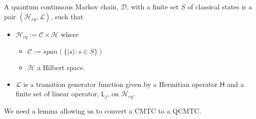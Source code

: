 \begin{definition}
  A quantum continuous Markov chain, $\mathcal{D}$, with a finite set
  $S$ of classical states is a pair $(\mathcal{H}_{cq},\mathcal{L})$,
  such that
  \begin{itemize}
     \item $\mathcal{H}_{cq} := \mathcal{C} \times \mathcal{H}$ where
       \begin{itemize}
          \item $\mathcal{C} := span(\{ \mathsf{|}s\rangle : s \in S\})$
          \item $\mathcal{H}$ a Hilbert space.
       \end{itemize}
     \item $\mathcal{L}$ is a transition generator function given by a
       Hermitian operator $\mathsf{H}$ and a finite set of linear
       operator, $\mathsf{L}_{j}$, on $\mathcal{H}_{cq}$.
  \end{itemize}
\end{definition}

We need a lemma allowing us to convert a CMTC to a QCMTC.









